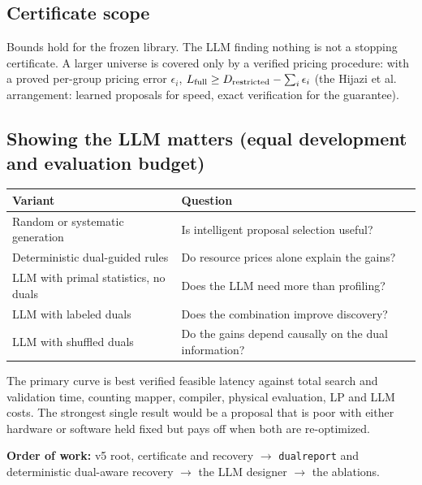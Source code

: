 \documentclass[10pt]{article}
\renewcommand{\_}{\textunderscore\allowbreak}
\begin{document}
\subsection*{Certificate scope}
 

Bounds hold for the frozen library. The LLM finding nothing is not a stopping certificate. A larger universe is covered only by a verified pricing procedure: with a proved per-group pricing error $\epsilon_i$, $L_{\rm full}\ge D_{\rm restricted}-\sum_i\epsilon_i$ (the Hijazi et al. arrangement: learned proposals for speed, exact verification for the guarantee).

 
\subsection*{Showing the LLM matters (equal development and evaluation budget)}
          
\begingroup\scriptsize
\setlength{\tabcolsep}{3pt}
\renewcommand{\arraystretch}{1.18}
\begin{xltabular}{\textwidth}{@{}>{\hsize\raggedright\arraybackslash}X >{\hsize\raggedright\arraybackslash}X@{}}
\toprule
\textbf{Variant} & \textbf{Question}\\
\midrule\endhead
Random or systematic generation & Is intelligent proposal selection useful?\\
Deterministic dual-guided rules & Do resource prices alone explain the gains?\\
LLM with primal statistics, no duals & Does the LLM need more than profiling?\\
LLM with labeled duals & Does the combination improve discovery?\\
LLM with shuffled duals & Do the gains depend causally on the dual information?\\
\bottomrule\end{xltabular}\endgroup
 

The primary curve is best verified feasible latency against total search and validation time, counting mapper, compiler, physical evaluation, LP and LLM costs. The strongest single result would be a proposal that is poor with either hardware or software held fixed but pays off when both are re-optimized.

 

\textbf{Order of work:} v5 root, certificate and recovery $\to$ \texttt{dual\_report} and deterministic dual-aware recovery $\to$ the LLM designer $\to$ the ablations.
\end{document}
